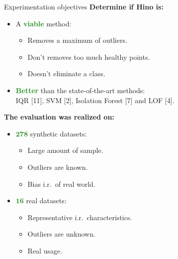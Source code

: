 \documentclass[aspectratio=169,dvipsnames]{beamer}
\begin{document}
\begin{frame}{Experimentation objectives}
	\textbf{Determine if Hino is:}
	\begin{itemize}
	\item A \textcolor{ForestGreen}{\textbf{viable}} method:
		\begin{itemize}
			\item Removes a maximum of outliers.
			\item Don't removes too much healthy points.
			\item Doesn't eliminate a class.
		\end{itemize}
	\item \textcolor{ForestGreen}{\textbf{Better}} than the state-of-the-art methods:\\ IQR [11], SVM [2], Isolation Forest [7] and LOF [4].
	\end{itemize}
	\vspace{0.25cm}

	\textbf{The evaluation was realized on:}\\
	\vspace{0.25cm}
	\begin{minipage}[c]{0.39\linewidth}
	\begin{itemize}
		\item \textcolor{ForestGreen}{$\mathbf{278}$} synthetic datasets:
		\begin{itemize}
		\item Large amount of sample.
		\item Outliers are known.
		\item Bias i.r.\ of real world.
		\end{itemize}
	\end{itemize}
	\end{minipage}
	\hfill
	\begin{minipage}[c]{0.6\linewidth}
	\begin{itemize}
		\item \textcolor{ForestGreen}{$\mathbf{16}$} real datasets:
		\begin{itemize}
		\item Representative i.r.\ characteristics.
		\item Outliers are unknown.
		\item Real usage.
		\end{itemize}
	\end{itemize}
	\end{minipage}
\end{frame}
\end{document}
